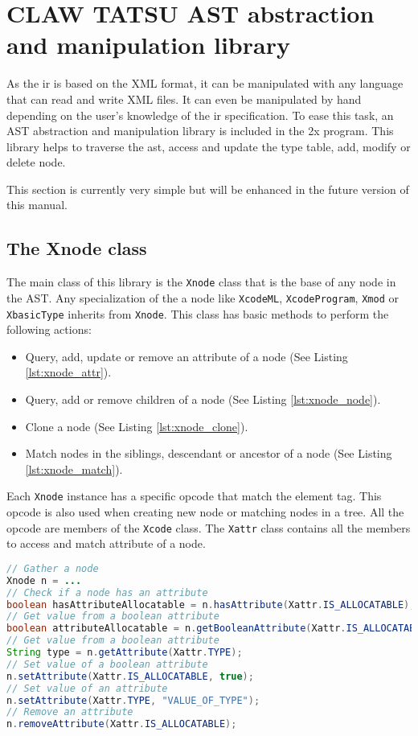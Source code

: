 \chapter{CLAW TATSU \xcodeml AST abstraction and manipulation library}
\label{chapter:clawtatsu}
As the \xcodeml \gls{ir} is based on the XML format, it can be manipulated with
any language that can read and write XML files. It can even be manipulated by
hand depending on the user's knowledge of the \xcodeml \gls{ir} specification.
To ease this task, an AST abstraction and manipulation library is included 
in the \cx2x program. This library helps to traverse the \gls{ast}, access and
update the type table, add, modify or delete node.

This section is currently very simple but will be enhanced in the future version
of this manual.

\section{The Xnode class}
The main class of this library is the \lstinline|Xnode| class that is the base
of any node in the AST. 
Any specialization of the a node like \lstinline|XcodeML|, 
\lstinline|XcodeProgram|, \lstinline|Xmod| or \lstinline|XbasicType| inherits 
from \lstinline|Xnode|.
This class has basic methods to perform the following actions:
\begin{itemize}
\item Query, add, update or remove an attribute of a node 
      (See Listing \ref{lst:xnode_attr}).
\item Query, add or remove children of a node (See Listing \ref{lst:xnode_node}).
\item Clone a node (See Listing \ref{lst:xnode_clone}).
\item Match nodes in the siblings, descendant or ancestor of a node 
      (See Listing \ref{lst:xnode_match}).
\end{itemize}

Each \lstinline|Xnode| instance has a specific opcode that match the \xcodeml 
element tag.
This opcode is also used when creating new node or matching nodes in a tree.
All the opcode are members of the \lstinline|Xcode| class.
The \lstinline|Xattr| class contains all the members to access and match 
attribute of a node. 

\begin{lstlisting}[label=lst:xnode_attr, language=Java, caption=XtypeTable]
// Gather a node
Xnode n = ...
// Check if a node has an attribute
boolean hasAttributeAllocatable = n.hasAttribute(Xattr.IS_ALLOCATABLE);
// Get value from a boolean attribute
boolean attributeAllocatable = n.getBooleanAttribute(Xattr.IS_ALLOCATABLE);
// Get value from a boolean attribute
String type = n.getAttribute(Xattr.TYPE);
// Set value of a boolean attribute
n.setAttribute(Xattr.IS_ALLOCATABLE, true);
// Set value of an attribute
n.setAttribute(Xattr.TYPE, "VALUE_OF_TYPE");
// Remove an attribute
n.removeAttribute(Xattr.IS_ALLOCATABLE);
\end{lstlisting}

